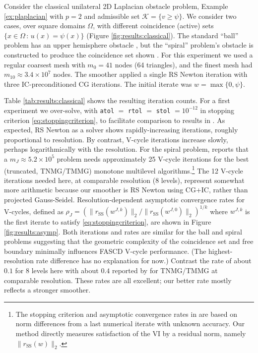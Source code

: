 \documentclass[review,hidelinks,onefignum,onetabnum]{siamart220329}
\newcommand{\rSS}{r_{\text{SS}}}
\begin{document}
\begin{example} \label{ex:results:classical}
Consider the classical unilateral 2D Laplacian obstacle problem, Example \ref{ex:plaplacian} with $p=2$ and admissible set $\mathcal{K} = \{v \ge \psi\}$.  We consider two cases, over square domains $\Omega$, with different coincidence (active) sets $\{x\in\Omega \,:\, u(x)=\psi(x)\}$ (Figure \ref{fig:results:classical}).  The standard ``ball'' problem has an upper hemisphere obstacle \cite[Chapter 12]{Bueler2021}, but the ``spiral'' problem's obstacle is constructed to produce the coincidence set shown \cite[problem 7.1.1]{GraeserKornhuber2009}.  For this experiment we used a regular coarsest mesh with $m_0=41$ nodes (64 triangles), and the finest mesh had $m_{10} \approx 3.4 \times 10^7$ nodes.  The smoother applied a single RS Newton iteration with three IC-preconditioned CG iterations.  The initial iterate was $w=\max\{0,\psi\}$.

Table \ref{tab:results:classical} shows the resulting iteration counts.  For a first experiment we over-solve, with \texttt{atol} $=$ \texttt{rtol} $=$ \texttt{stol} $= 10^{-12}$ in stopping criterion \eqref{eq:stoppingcriterion}, to facilitate comparison to results in \cite[section 7]{GraeserKornhuber2009}.  As expected, RS Newton as a solver shows rapidly-increasing iterations, roughly proportional to resolution.  By contrast, V-cycle iterations increase slowly, perhaps logarithmically with the resolution.  For the spiral problem, \cite[Figure 7.11]{GraeserKornhuber2009} reports that a $m_J \approx 5.2 \times 10^5$ problem needs approximately 25 V-cycle iterations for the best (truncated, TNMG/TMMG) monotone multilevel algorithms.\footnote{The stopping criterion and asymptotic convergence rates in \cite{GraeserKornhuber2009} are based on norm differences from a last numerical iterate with unknown accuracy.  Our method directly measures satisfaction of the VI by a residual norm, namely $\|\rSS(w)\|_2$.}  The 12 V-cycle iterations needed here, at comparable resolution (8 levels), represent somewhat more arithmetic because our smoother is RS Newton using CG+IC, rather than projected Gauss-Seidel.  Resolution-dependent asymptotic convergence rates for V-cycles, defined as $\rho_J=(\|\rSS(w^{J,k})\|_2/\|\rSS(w^{J,0})\|_2)^{1/k}$ where $w^{J,k}$ is the first iterate to satisfy \eqref{eq:stoppingcriterion}, are shown in Figure \ref{fig:results:asymp}.  Both iterations and rates are similar for the ball and spiral problems suggesting that the geometric complexity of the coincidence set and free boundary minimally influences FASCD V-cycle performance.  (The highest-resolution rate difference has no explanation for now.)  Contrast the rate of about $0.1$ for 8 levels here with about $0.4$ reported by \cite[Figure 7.11]{GraeserKornhuber2009} for TNMG/TMMG at comparable resolution.  These rates are all excellent; our better rate mostly reflects a stronger smoother.


\end{example}
\end{document}
